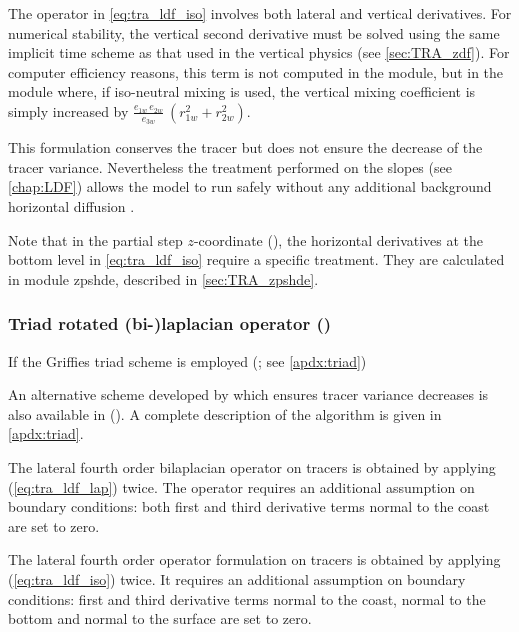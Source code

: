 \documentclass[../main/NEMO_manual]{subfiles}
\begin{document}
The operator in \autoref{eq:tra_ldf_iso} involves both lateral and vertical derivatives.
For numerical stability, the vertical second derivative must be solved using the same implicit time scheme as that
used in the vertical physics (see \autoref{sec:TRA_zdf}).
For computer efficiency reasons, this term is not computed in the  module,
but in the  module where, if iso-neutral mixing is used,
the vertical mixing coefficient is simply increased by
$\frac{e_{1w}\,e_{2w} }{e_{3w} }\ \left( {r_{1w} ^2+r_{2w} ^2} \right)$. 

This formulation conserves the tracer but does not ensure the decrease of the tracer variance.
Nevertheless the treatment performed on the slopes (see \autoref{chap:LDF}) allows the model to run safely without
any additional background horizontal diffusion \citep{Guilyardi_al_CD01}. 

Note that in the partial step $z$-coordinate (),
the horizontal derivatives at the bottom level in \autoref{eq:tra_ldf_iso} require a specific treatment.
They are calculated in module zpshde, described in \autoref{sec:TRA_zpshde}.

\subsubsection{Triad rotated (bi-)laplacian operator (\protect{})}
\label{subsec:TRA_ldf_triad}

If the Griffies triad scheme is employed (; see \autoref{apdx:triad})

An alternative scheme developed by \cite{Griffies_al_JPO98} which ensures tracer variance decreases
is also available in \NEMO ().
A complete description of the algorithm is given in \autoref{apdx:triad}.

The lateral fourth order bilaplacian operator on tracers is obtained by applying (\autoref{eq:tra_ldf_lap}) twice.
The operator requires an additional assumption on boundary conditions:
both first and third derivative terms normal to the coast are set to zero.

The lateral fourth order operator formulation on tracers is obtained by applying (\autoref{eq:tra_ldf_iso}) twice.
It requires an additional assumption on boundary conditions:
first and third derivative terms normal to the coast,
normal to the bottom and normal to the surface are set to zero. 
\end{document}
